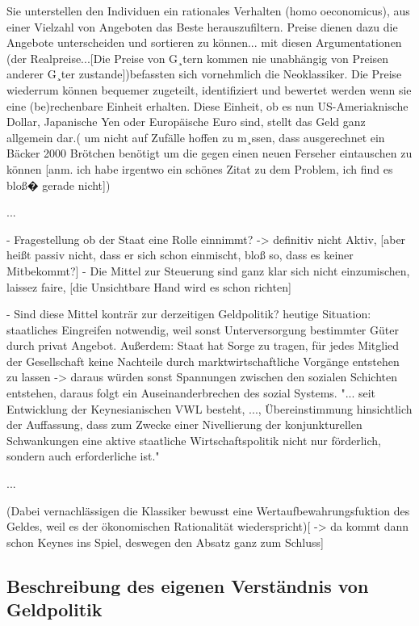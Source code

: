 \documentclass[
onecolumn,
a4paper,
abstracton,
parskip=half
,final
]{scrartcl}
\begin{document}
Sie unterstellen den Individuen ein rationales Verhalten (homo oeconomicus), aus einer
 Vielzahl von Angeboten das Beste herauszufiltern. Preise dienen dazu die Angebote
unterscheiden und sortieren zu k{\"o}nnen... mit diesen Argumentationen  (der Realpreise...[Die
Preise von G¸tern kommen nie unabh{\"a}ngig von Preisen anderer G¸ter zustande])befassten sich
vornehmlich die Neoklassiker. Die Preise wiederrum k{\"o}nnen bequemer zugeteilt,
identifiziert und bewertet werden wenn sie eine (be)rechenbare Einheit erhalten.
Diese Einheit, ob es nun US-Ameriaknische Dollar, Japanische Yen oder Europ{\"a}ische Euro
sind, stellt das Geld ganz allgemein dar.( um nicht auf Zuf{\"a}lle hoffen zu m¸ssen, dass
ausgerechnet ein B{\"a}cker 2000 Br{\"o}tchen ben{\"o}tigt um die gegen einen neuen Ferseher eintauschen
zu k{\"o}nnen [anm. ich habe irgentwo ein sch{\"o}nes Zitat zu dem Problem, ich find es blo{\ss}� gerade
nicht])

...

- Fragestellung ob der Staat eine Rolle einnimmt? -> definitiv nicht Aktiv,
[aber hei{\ss}t passiv nicht, dass er sich schon einmischt, blo{\ss} so, dass es keiner Mitbekommt?]
- Die Mittel zur Steuerung sind ganz klar sich nicht einzumischen, laissez faire,
[die Unsichtbare Hand wird es schon richten]


- Sind diese Mittel kontr{\"a}r zur derzeitigen Geldpolitik?
heutige Situation: staatliches Eingreifen notwendig, weil sonst Unterversorgung bestimmter
G{\"u}ter durch privat Angebot. Au{\ss}erdem: Staat hat Sorge zu tragen, f{\"u}r jedes Mitglied der
Gesellschaft keine Nachteile durch marktwirtschaftliche Vorg{\"a}nge entstehen zu lassen -> daraus
w{\"u}rden sonst Spannungen zwischen den sozialen Schichten entstehen, daraus folgt ein
Auseinanderbrechen des sozial Systems. "... seit Entwicklung der Keynesianischen VWL besteht,
..., {\"U}bereinstimmung hinsichtlich der Auffassung, dass zum Zwecke einer Nivellierung der
konjunkturellen Schwankungen eine aktive staatliche Wirtschaftspolitik nicht nur f{\"o}rderlich,
 sondern auch erforderliche ist."

...

(Dabei vernachl{\"a}ssigen die Klassiker bewusst eine Wertaufbewahrungsfuktion des Geldes, weil es
der {\"o}konomischen Rationalit{\"a}t wiederspricht)[ -> da kommt dann schon Keynes ins Spiel, deswegen
den Absatz ganz zum Schluss]



\subsection{Beschreibung des eigenen Verst{\"a}ndnis von Geldpolitik}
\end{document}
